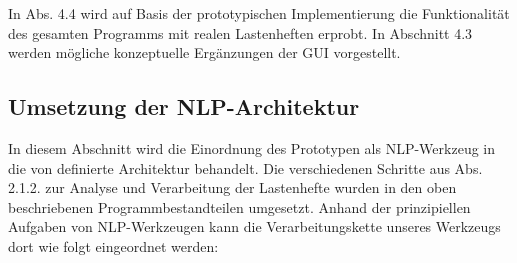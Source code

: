 \documentclass[12pt]{report}
\begin{document}
In Abs. 4.4 wird auf Basis der prototypischen Implementierung die Funktionalität des gesamten Programms mit realen Lastenheften erprobt. In Abschnitt 4.3 werden mögliche konzeptuelle Ergänzungen der GUI vorgestellt. 

\subsection{Umsetzung der NLP-Architektur}
In diesem Abschnitt wird die Einordnung des Prototypen als NLP-Werkzeug in die von \cite{cop04} definierte Architektur behandelt. Die verschiedenen Schritte aus Abs. 2.1.2. zur Analyse und Verarbeitung der Lastenhefte wurden in den oben beschriebenen Programmbestandteilen umgesetzt. Anhand der prinzipiellen Aufgaben von NLP-Werkzeugen kann die Verarbeitungskette unseres Werkzeugs dort wie folgt eingeordnet werden:
\end{document}
